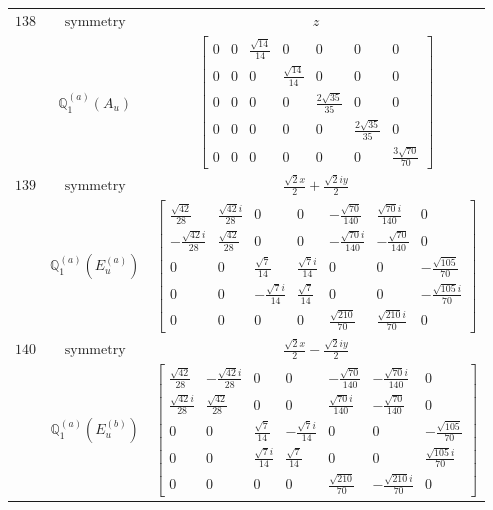 \documentclass[fleqn,8pt,landscape]{jsarticle}
\begin{document}
\begin{longtable}{ccc}
$ 138 $ & $ \text{symmetry} $ & $ z $ \\
$  $ & $ \mathbb{Q}_{1}^{(a)}(A_{u}) $ & $ \begin{bmatrix} 0 & 0 & \frac{\sqrt{14}}{14} & 0 & 0 & 0 & 0 \\ 0 & 0 & 0 & \frac{\sqrt{14}}{14} & 0 & 0 & 0 \\ 0 & 0 & 0 & 0 & \frac{2 \sqrt{35}}{35} & 0 & 0 \\ 0 & 0 & 0 & 0 & 0 & \frac{2 \sqrt{35}}{35} & 0 \\ 0 & 0 & 0 & 0 & 0 & 0 & \frac{3 \sqrt{70}}{70} \end{bmatrix} $ \\ \hline
$ 139 $ & $ \text{symmetry} $ & $ \frac{\sqrt{2} x}{2} + \frac{\sqrt{2} i y}{2} $ \\
$  $ & $ \mathbb{Q}_{1}^{(a)}(E_{u}^{(a)}) $ & $ \begin{bmatrix} \frac{\sqrt{42}}{28} & \frac{\sqrt{42} i}{28} & 0 & 0 & - \frac{\sqrt{70}}{140} & \frac{\sqrt{70} i}{140} & 0 \\ - \frac{\sqrt{42} i}{28} & \frac{\sqrt{42}}{28} & 0 & 0 & - \frac{\sqrt{70} i}{140} & - \frac{\sqrt{70}}{140} & 0 \\ 0 & 0 & \frac{\sqrt{7}}{14} & \frac{\sqrt{7} i}{14} & 0 & 0 & - \frac{\sqrt{105}}{70} \\ 0 & 0 & - \frac{\sqrt{7} i}{14} & \frac{\sqrt{7}}{14} & 0 & 0 & - \frac{\sqrt{105} i}{70} \\ 0 & 0 & 0 & 0 & \frac{\sqrt{210}}{70} & \frac{\sqrt{210} i}{70} & 0 \end{bmatrix} $ \\ \hline
$ 140 $ & $ \text{symmetry} $ & $ \frac{\sqrt{2} x}{2} - \frac{\sqrt{2} i y}{2} $ \\
$  $ & $ \mathbb{Q}_{1}^{(a)}(E_{u}^{(b)}) $ & $ \begin{bmatrix} \frac{\sqrt{42}}{28} & - \frac{\sqrt{42} i}{28} & 0 & 0 & - \frac{\sqrt{70}}{140} & - \frac{\sqrt{70} i}{140} & 0 \\ \frac{\sqrt{42} i}{28} & \frac{\sqrt{42}}{28} & 0 & 0 & \frac{\sqrt{70} i}{140} & - \frac{\sqrt{70}}{140} & 0 \\ 0 & 0 & \frac{\sqrt{7}}{14} & - \frac{\sqrt{7} i}{14} & 0 & 0 & - \frac{\sqrt{105}}{70} \\ 0 & 0 & \frac{\sqrt{7} i}{14} & \frac{\sqrt{7}}{14} & 0 & 0 & \frac{\sqrt{105} i}{70} \\ 0 & 0 & 0 & 0 & \frac{\sqrt{210}}{70} & - \frac{\sqrt{210} i}{70} & 0 \end{bmatrix} $ \\ \hline

\end{longtable}
\end{document}
